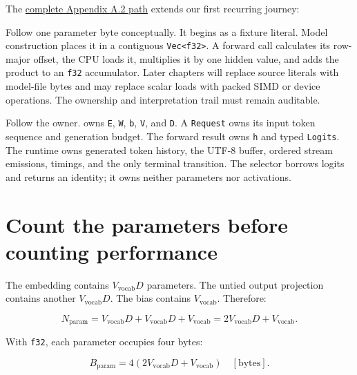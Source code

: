 The
\href{https://github.com/hermonai/inside-the-llm-engine/blob/astra-visual-rewrite/diagrams/model/token-id-to-logits.txt}{complete
Appendix A.2 path} extends our first recurring journey:


Follow one parameter byte conceptually. It begins as a fixture literal.
Model construction places it in a contiguous
\texttt{Vec\textless{}f32\textgreater{}}. A forward call calculates its
row-major offset, the CPU loads it, multiplies it by one hidden value,
and adds the product to an \texttt{f32} accumulator. Later chapters will
replace source literals with model-file bytes and may replace scalar
loads with packed SIMD or device operations. The ownership and
interpretation trail must remain auditable.

Follow the owner. \texttt{} owns \texttt{E},
\texttt{W}, \texttt{b}, \texttt{V}, and \texttt{D}. A \texttt{Request}
owns its input token sequence and generation budget. The forward result
owns \texttt{h} and typed \texttt{Logits}. The runtime owns generated
token history, the UTF-8 buffer, ordered stream emissions, timings, and
the only terminal transition. The selector borrows logits and returns an
identity; it owns neither parameters nor activations.

\section{Count the parameters before counting
performance}\label{count-the-parameters-before-counting-performance}

The embedding contains \(V_{\mathrm{vocab}}D\) parameters. The untied
output projection contains another \(V_{\mathrm{vocab}}D\). The bias
contains \(V_{\mathrm{vocab}}\). Therefore:

\begin{equation}
N_{\mathrm{param}}
=V_{\mathrm{vocab}}D+V_{\mathrm{vocab}}D+V_{\mathrm{vocab}}
=2V_{\mathrm{vocab}}D+V_{\mathrm{vocab}}.
\end{equation}

With \texttt{f32}, each parameter occupies four bytes:

\begin{equation}
B_{\mathrm{param}}
=4\left(2V_{\mathrm{vocab}}D+V_{\mathrm{vocab}}\right)
\quad[\mathrm{bytes}].
\end{equation}

